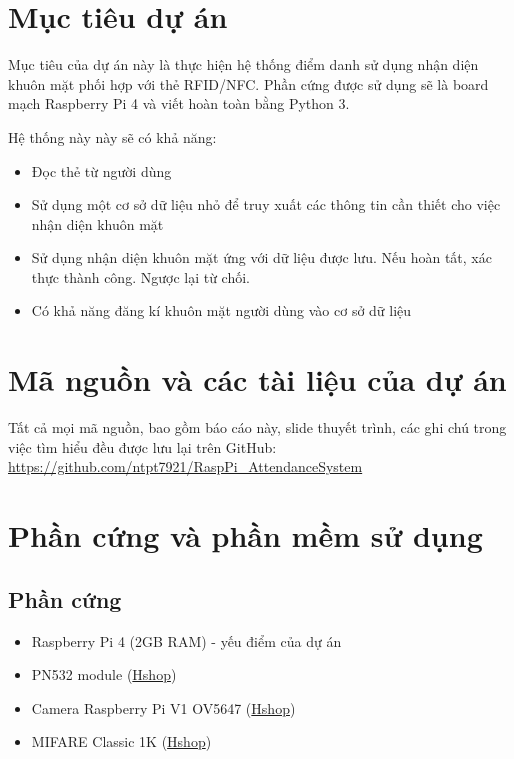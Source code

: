 \hypertarget{mux1ee5c-tiuxeau-dux1ef1-uxe1n}{%
\section{Mục tiêu dự án}\label{mux1ee5c-tiuxeau-dux1ef1-uxe1n}}

Mục tiêu của dự án này là thực hiện hệ thống điểm danh sử dụng nhận diện
khuôn mặt phối hợp với thẻ RFID/NFC. Phần cứng được sử dụng sẽ là board
mạch Raspberry Pi 4 và viết hoàn toàn bằng Python 3.

Hệ thống này này sẽ có khả năng:

\begin{itemize}
\tightlist
\item
  Đọc thẻ từ người dùng
\item
  Sử dụng một cơ sở dữ liệu nhỏ để truy xuất các thông tin cần thiết cho
  việc nhận diện khuôn mặt
\item
  Sử dụng nhận diện khuôn mặt ứng với dữ liệu được lưu. Nếu hoàn tất,
  xác thực thành công. Ngược lại từ chối.
\item
  Có khả năng đăng kí khuôn mặt người dùng vào cơ sở dữ liệu
\end{itemize}

\hypertarget{muxe3-nguux1ed3n-vuxe0-cuxe1c-tuxe0i-liux1ec7u-cux1ee7a-dux1ef1-uxe1n}{%
\section{Mã nguồn và các tài liệu của dự
án}\label{muxe3-nguux1ed3n-vuxe0-cuxe1c-tuxe0i-liux1ec7u-cux1ee7a-dux1ef1-uxe1n}}

Tất cả mọi mã nguồn, bao gồm báo cáo này, slide thuyết trình, các ghi
chú trong việc tìm hiểu đều được lưu lại trên GitHub:
\url{https://github.com/ntpt7921/RaspPi_AttendanceSystem}

\hypertarget{phux1ea7n-cux1ee9ng-vuxe0-phux1ea7n-mux1ec1m-sux1eed-dux1ee5ng}{%
\section{Phần cứng và phần mềm sử
dụng}\label{phux1ea7n-cux1ee9ng-vuxe0-phux1ea7n-mux1ec1m-sux1eed-dux1ee5ng}}

\hypertarget{phux1ea7n-cux1ee9ng}{%
\subsection{Phần cứng}\label{phux1ea7n-cux1ee9ng}}

\begin{itemize}
\tightlist
\item
  Raspberry Pi 4 (2GB RAM) - yếu điểm của dự án
\item
  PN532 module
  (\href{https://hshop.vn/products/mach-rfid-nfc-13-56mhz-pn532}{Hshop})
\item
  Camera Raspberry Pi V1 OV5647
  (\href{https://hshop.vn/products/camera-raspberry-pi}{Hshop})
\item
  MIFARE Classic 1K
  (\href{https://hshop.vn/products/the-nhua-nfc-philips-s50rfid-13-56-mhz}{Hshop})
\end{itemize}


